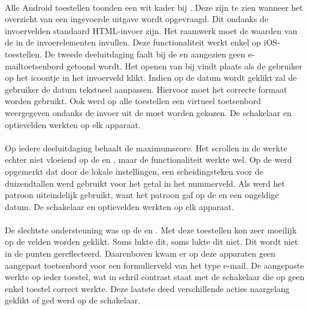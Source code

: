 \paragraph{\kendo}
Alle Android toestellen toonden een wit kader bij  .
Deze zijn te zien wanneer het overzicht van een ingevoerde uitgave wordt opgevraagd.
Dit ondanks de invoervelden standaard HTML-invoer zijn.
Het raamwerk moet de waarden van de  in de  invoerelementen invullen.
Deze functionaliteit werkt enkel op iOS-toestellen.
De tweede deeluitdaging faalt bij de \htc{} en \gtab{} aangezien geen e-mailtoetsenbord getoond wordt.
Het openen van  bij \kendo{} vindt plaats als de gebruiker op het icoontje in het invoerveld klikt.
Indien op de datum wordt geklikt zal de gebruiker de datum tekstueel aanpassen.  
Hiervoor moet het correcte formaat worden gebruikt.
Ook werd op alle toestellen een virtueel toetsenbord weergegeven ondanks de invoer uit de  moet worden gekozen.
De schakelaar en optievelden werkten op elk apparaat.

\paragraph{\jqm}
Op iedere deeluitdaging behaalt \jqm{} de maximumscore.
Het scrollen in de  werkte echter niet vloeiend op de \htc{} en \gtab{}, maar de functionaliteit werkte wel.
Op de \ipadi{} werd opgemerkt dat door de lokale instellingen, een scheidingsteken voor de duizendtallen werd gebruikt voor het getal in het nummerveld.
Als  werd het patroon  uiteindelijk gebruikt, want het patroon  gaf op de \htc{} en \gtab{} een ongeldige datum.
De schakelaar en optievelden werkten op elk apparaat.

\paragraph{\lungo}
De slechtste ondersteuning was op de \htc{} en \gtab{}.
Met deze toestellen kon zeer moeilijk op de velden worden geklikt.
Soms lukte dit, soms lukte dit niet.
Dit wordt niet in de punten gereflecteerd.
Daarenboven kwam er op deze apparaten geen aangepast toetsenbord voor een formulierveld van het type e-mail.
De aangepaste  werkte op ieder toestel, wat in schril contrast staat met de schakelaar die op geen enkel toestel correct werkte.
Deze laatste deed verschillende acties naargelang geklikt of ged werd op de schakelaar.

